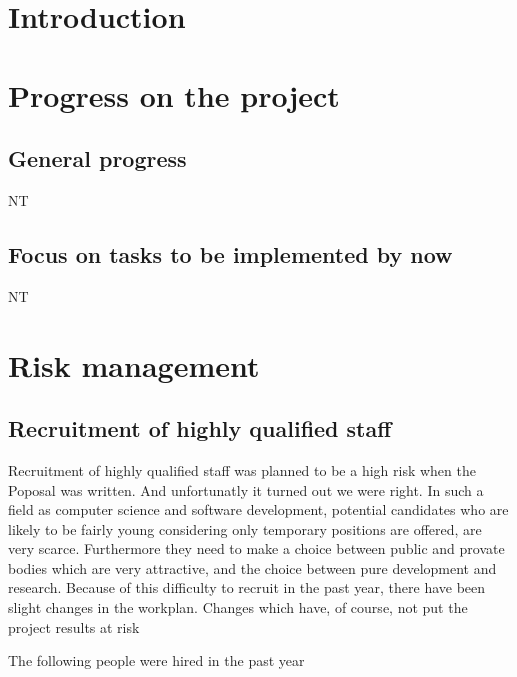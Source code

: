 \documentclass{../../Proposal/LaTeX-proposal/deliverablereport}
\author{Nicolas Thiéry \& Benoît Pilorget}
\begin{document}
\maketitle
\githubissuedescription
\newpage


\tableofcontents\newpage

\section{Introduction}

\section{Progress on the project}

\subsection{General progress}

NT

\subsection{Focus on tasks to be implemented by now} 

NT

\section{Risk management}
\subsection{Recruitment of highly qualified staff}

Recruitment of highly qualified staff was planned to be a high risk when the Poposal was written. And unfortunatly it turned out we were right. In such a field as computer science and software development, potential candidates who are likely to be fairly young considering only temporary positions are offered, are very scarce. Furthermore they need to make a choice between public and provate bodies which are very attractive, and the choice between pure development and research.
Because of this difficulty to recruit in the past year, there have been slight changes in the workplan. Changes which have, of course, not put the project results at risk

The following people were hired in the past year
\end{document}
